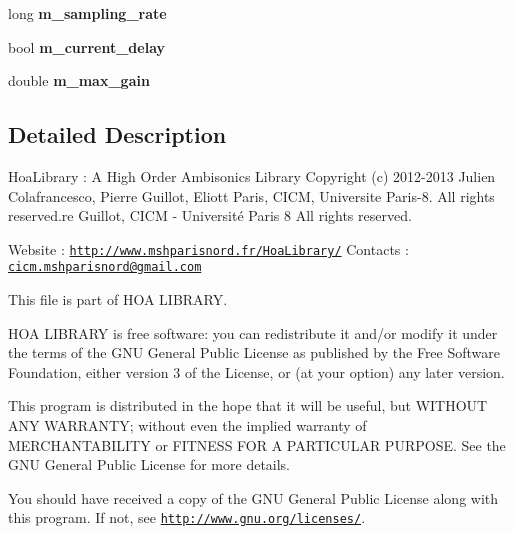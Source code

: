 \begin{DoxyCompactItemize}
\item 
\hypertarget{class_cicm_decorrelation_ac0f74442ab5589fadb12506901891ab8}{long {\bfseries m\-\_\-sampling\-\_\-rate}}\label{class_cicm_decorrelation_ac0f74442ab5589fadb12506901891ab8}

\item 
\hypertarget{class_cicm_decorrelation_ab29359b5e03582b47148613d794564c8}{bool {\bfseries m\-\_\-current\-\_\-delay}}\label{class_cicm_decorrelation_ab29359b5e03582b47148613d794564c8}

\item 
\hypertarget{class_cicm_decorrelation_a56b9a6b601cd341c0193e57d604d2aaa}{double {\bfseries m\-\_\-max\-\_\-gain}}\label{class_cicm_decorrelation_a56b9a6b601cd341c0193e57d604d2aaa}

\end{DoxyCompactItemize}


\subsection{Detailed Description}
Hoa\-Library \-: A High Order Ambisonics Library Copyright (c) 2012-\/2013 Julien Colafrancesco, Pierre Guillot, Eliott Paris, C\-I\-C\-M, Universite Paris-\/8. All rights reserved.\-re Guillot, C\-I\-C\-M -\/ Université Paris 8 All rights reserved.

Website \-: \href{http://www.mshparisnord.fr/HoaLibrary/}{\tt http\-://www.\-mshparisnord.\-fr/\-Hoa\-Library/} Contacts \-: \href{mailto:cicm.mshparisnord@gmail.com}{\tt cicm.\-mshparisnord@gmail.\-com}

This file is part of H\-O\-A L\-I\-B\-R\-A\-R\-Y.

H\-O\-A L\-I\-B\-R\-A\-R\-Y is free software\-: you can redistribute it and/or modify it under the terms of the G\-N\-U General Public License as published by the Free Software Foundation, either version 3 of the License, or (at your option) any later version.

This program is distributed in the hope that it will be useful, but W\-I\-T\-H\-O\-U\-T A\-N\-Y W\-A\-R\-R\-A\-N\-T\-Y; without even the implied warranty of M\-E\-R\-C\-H\-A\-N\-T\-A\-B\-I\-L\-I\-T\-Y or F\-I\-T\-N\-E\-S\-S F\-O\-R A P\-A\-R\-T\-I\-C\-U\-L\-A\-R P\-U\-R\-P\-O\-S\-E. See the G\-N\-U General Public License for more details.

You should have received a copy of the G\-N\-U General Public License along with this program. If not, see \href{http://www.gnu.org/licenses/}{\tt http\-://www.\-gnu.\-org/licenses/}. 

